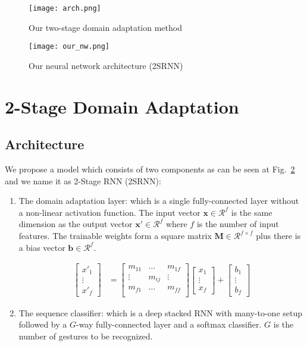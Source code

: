 \documentclass[conference]{IEEEtran}
\begin{document}
\begin{figure}[tbp]
\centerline{\texttt{[image: arch.png]}}
\caption{Our two-stage domain adaptation method}
\label{our_training}
\end{figure}

\begin{figure}[tbp]
\centerline{\texttt{[image: our\_nw.png]}}
\caption{Our neural network architecture (2SRNN)}
\label{our_nw}
\end{figure}

\section{2-Stage Domain Adaptation} \label{sec:architecture}
\subsection{Architecture}

We propose a model which consists of two components as can be seen at Fig.~\ref{our_nw} and we name it as 2-Stage RNN (2SRNN):
\begin{enumerate}
  \item The domain adaptation layer: which is a single fully-connected layer without a non-linear activation function. The input vector $\mathbf{x} \in \mathcal{R}^f$ is the same dimension
  as the output vector $\mathbf{x'} \in \mathcal{R}^f$ where $f$ is the number of input features.
  The trainable weights form a square matrix $\mathbf{M} \in \mathcal{R}^{f \times f}$ plus there is a bias vector $\mathbf{b} \in \mathcal{R}^f$.

\def\horzbar{\text{magic}}
\begin{align*}
\begin{bmatrix}
  x'_{1}  \\
  \vdots \\
  x'_{f}
\end{bmatrix}
 &= \left[\begin{array}{ccc}
  m_{11} & \dots & m_{1f} \\
  \vdots & m_{ij} & \vdots \\
  m_{f1} & \dots & m_{ff} \\ 
\end{array}\right]
\begin{bmatrix}
  x_{1}  \\
  \vdots \\
  x_{f}
\end{bmatrix}
{} + \begin{bmatrix}
  b_{1}  \\
  \vdots \\
  b_{f}
\end{bmatrix}
\end{align*}

  \item The sequence classifier: which is a deep stacked RNN with many-to-one setup followed by a $G$-way fully-connected layer and a softmax classifier.
  $G$ is the number of gestures to be recognized.
\end{enumerate}
\end{document}

